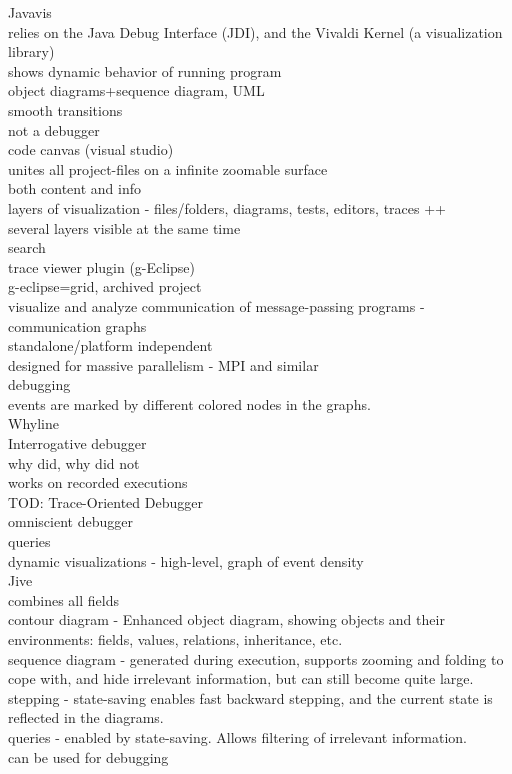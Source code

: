 Javavis\\
	relies on the Java Debug Interface (JDI), and the Vivaldi Kernel (a visualization library)\\
	shows dynamic behavior of running program\\
	object diagrams+sequence diagram, UML\\
	smooth transitions\\
	not a debugger\\
	
code canvas (visual studio)\\
	unites all project-files on a infinite zoomable surface\\
	both content and info\\
	layers of visualization - files/folders, diagrams, tests, editors, traces ++\\
	several layers visible at the same time\\
	search\\

trace viewer plugin (g-Eclipse)\\
	g-eclipse=grid, archived project\\
	visualize and analyze communication of message-passing programs - communication graphs\\
	standalone/platform independent\\
	designed for massive parallelism - MPI and similar\\
	debugging\\
	events are marked by different colored nodes in the graphs.\\

Whyline\\
	Interrogative debugger\\
	why did, why did not\\
	works on recorded executions\\

TOD: Trace-Oriented Debugger\\
	omniscient debugger\\
	queries\\
	dynamic visualizations - high-level, graph of event density\\

Jive\\
	combines all fields\\
	contour diagram - Enhanced object diagram, showing objects and their environments: fields, values, relations, inheritance, etc.\\
	sequence diagram - generated during execution, supports zooming and folding to cope with, and hide irrelevant information, but can still become quite large.\\
	stepping - state-saving enables fast backward stepping, and the current state is reflected in the diagrams.\\
	queries - enabled by state-saving. Allows filtering of irrelevant information.\\
	can be used for debugging\\




